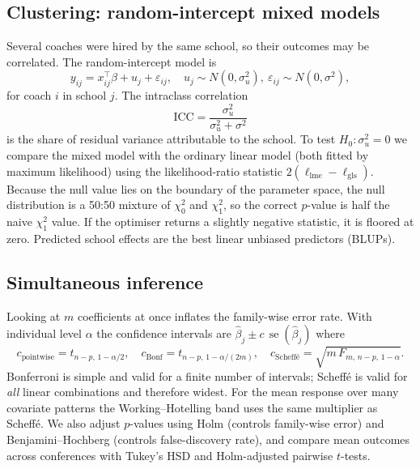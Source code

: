 \documentclass[11pt,a4paper]{article}
\begin{document}
\subsection{Clustering: random-intercept mixed models}
Several coaches were hired by the same school, so their outcomes may be correlated. The random-intercept model is
\[
y_{ij}=x_{ij}^\top\beta+u_j+\varepsilon_{ij},\quad u_j\sim N(0,\sigma_u^2),\ \varepsilon_{ij}\sim N(0,\sigma^2),
\]
for coach $i$ in school $j$. The intraclass correlation
\[
\mathrm{ICC}=\frac{\sigma_u^2}{\sigma_u^2+\sigma^2}
\]
is the share of residual variance attributable to the school. To test $H_0:\sigma_u^2=0$ we compare the mixed model with the ordinary linear model (both fitted by maximum likelihood) using the likelihood-ratio statistic $2(\ell_{\text{lme}}-\ell_{\text{gls}})$. Because the null value lies on the boundary of the parameter space, the null distribution is a 50:50 mixture of $\chi^2_0$ and $\chi^2_1$, so the correct $p$-value is half the naive $\chi^2_1$ value. If the optimiser returns a slightly negative statistic, it is floored at zero. Predicted school effects are the best linear unbiased predictors (BLUPs).

\subsection{Simultaneous inference}
Looking at $m$ coefficients at once inflates the family-wise error rate. With individual level $\alpha$ the confidence intervals are $\hat\beta_j\pm c\,\operatorname{se}(\hat\beta_j)$ where
\[
c_{\text{pointwise}}=t_{n-p,\,1-\alpha/2},\quad
c_{\text{Bonf}}=t_{n-p,\,1-\alpha/(2m)},\quad
c_{\text{Scheff\'e}}=\sqrt{m\,F_{m,\,n-p,\,1-\alpha}}.
\]
Bonferroni is simple and valid for a finite number of intervals; Scheff\'e is valid for \emph{all} linear combinations and therefore widest. For the mean response over many covariate patterns the Working--Hotelling band uses the same multiplier as Scheff\'e. We also adjust $p$-values using Holm (controls family-wise error) and Benjamini--Hochberg (controls false-discovery rate), and compare mean outcomes across conferences with Tukey's HSD and Holm-adjusted pairwise $t$-tests.
\end{document}
